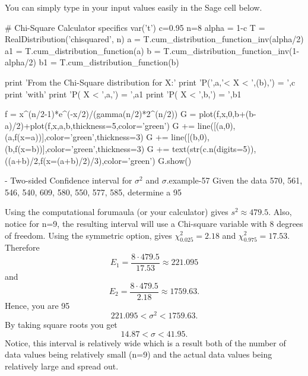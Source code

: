 \documentclass[10pt,]{book}
\numberwithin{equation}{section}
\newcommand{\lt}{<}
\begin{document}
You can simply type in your input values easily in the Sage cell below. \leavevmode%
\begin{sageinput}
# Chi-Square Calculator specifics
var('t')
c=0.95
n=8
alpha = 1-c
T = RealDistribution('chisquared', n)
a = T.cum_distribution_function_inv(alpha/2)
a1 = T.cum_distribution_function(a)
b = T.cum_distribution_function_inv(1-alpha/2)
b1 = T.cum_distribution_function(b)

print 'From the Chi-Square distribution for X:'
print 'P(',a,'< X < ',(b),') = ',c
print 'with'
print 'P( X < ',a,') = ',a1
print 'P( X < ',b,') = ',b1

f = x^(n/2-1)*e^(-x/2)/(gamma(n/2)*2^(n/2))
G = plot(f,x,0,b+(b-a)/2)+plot(f,x,a,b,thickness=5,color='green')
G += line([(a,0),(a,f(x=a))],color='green',thickness=3)
G += line([(b,0),(b,f(x=b))],color='green',thickness=3)
G += text(str(c.n(digits=5)),((a+b)/2,f(x=(a+b)/2)/3),color='green')
G.show()
\end{sageinput}
 \hypertarget{p-1412}{}%
\begin{example}{- Two-sided Confidence interval for \(\sigma^2\) and \(\sigma\).}{example-57}%
\hypertarget{p-1413}{}%
Given the data 570, 561, 546, 540, 609, 580, 550, 577, 585, determine a 95%
\par
\hypertarget{p-1414}{}%
Using the computational forumaula (or your calculator) gives \(s^2 \approx 479.5\). Also, notice for n=9, the resulting interval will use a Chi-square variable with 8 degrees of freedom. Using the symmetric option, gives \(\chi_{0.025}^2 = 2.18\) and \(\chi_{0.975}^2 = 17.53\).  Therefore%
\begin{equation*}
E_1 = \frac{8 \cdot 479.5}{17.53} \approx 221.095
\end{equation*}
and%
\begin{equation*}
E_2 = \frac{8 \cdot 479.5}{2.18} \approx 1759.63.
\end{equation*}
Hence, you are 95%
\begin{equation*}
221.095 \lt \sigma^2 \lt 1759.63.
\end{equation*}
By taking square roots you get%
\begin{equation*}
14.87 \lt \sigma \lt 41.95.
\end{equation*}
Notice, this interval is relatively wide which is a result both of the number of data values being relatively small (n=9) and the actual data values being relatively large and spread out.%
\end{example}
%
 \par
\end{document}
